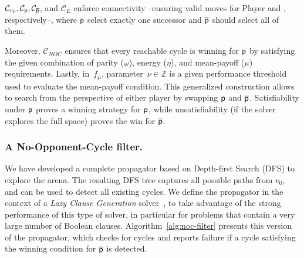 \documentclass[a4paper,UKenglish,cleveref, autoref, thm-restate]{lipics-v2021}
\begin{document}
$\mathcal{C}_{v_0}, \mathcal{C}_{\mathsf{p}}, \mathcal{C}_{\overline{\mathsf{p}}}$, and $\mathcal{C}_{\!E}$ enforce connectivity --ensuring valid moves for Player \even and \odd, respectively--, where $\mathsf{p}$ select exactly one successor and $\overline{\mathsf{p}}$ should select all of them.  

Moreover, $\mathcal{C}_{\!N\!O\!C}$ ensures that every reachable cycle is winning for $\mathsf{p}$ by satisfying the given combination of parity ($\omega$), energy ($\eta$), and mean-payoff ($\mu$) requirements. Lastly, in~$f_\mu$, parameter~$\nu \in \mathbb{Z}$ is a given performance threshold used to evaluate the mean-payoff condition. This generalized construction allows \nocq to search from the perspective of either player by swapping $\mathsf{p}$ and $\overline{\mathsf{p}}$. Satisfiability under $\mathsf{p}$ proves a winning strategy for $\mathsf{p}$, while unsatisfiability (if the solver explores the full space) proves the win for $\overline{\mathsf{p}}$.

\subsubsection{A No-Opponent-Cycle filter.} \label{sec:nocfilter}
We have developed a complete propagator based on Depth-first Search (DFS) to explore the arena. The resulting DFS tree captures all possible paths from $v_0$, and can be used to detect all existing cycles. We define the propagator in the context of a \textit{Lazy Clause Generation} solver~\cite{chuffed:2018}, to take advantage of the strong performance of this type of solver, in particular for problems that contain a very large number of Boolean clauses. Algorithm~\ref{alg:noc-filter} presents this version of the propagator, which checks for cycles and reports failure if a cycle 
satisfying the winning condition for 
$\overline{\mathsf{p}}$ is detected.
\end{document}
